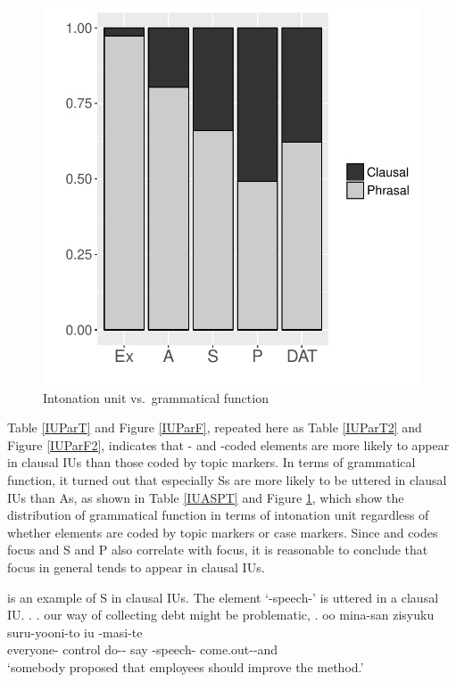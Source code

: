 \begin{figure}
	\begin{center}
	\includegraphics[width=.5\textwidth]{figure/IUASP.pdf}
	\caption{Intonation unit vs.~grammatical function}
	\label{IUASPF}
	\end{center}
\end{figure}

Table \ref{IUParT} and Figure \ref{IUParF},
repeated here as Table \ref{IUParT2} and Figure \ref{IUParF2},
indicates that - and -coded elements are more likely to
appear in clausal IUs than those coded by topic markers.
In terms of grammatical function,
it turned out that especially Ss are more likely to be uttered in
clausal IUs than As,
as shown in Table \ref{IUASPT} and Figure \ref{IUASPF},
which show the distribution of grammatical function in terms of intonation unit regardless of whether elements are coded by topic markers or case markers.
Since  and  codes focus and
S and P also correlate with focus,
it is reasonable to conclude that
focus in general tends to appear in clausal IUs.

\Next[b] is an example of S in clausal IUs.
The element  `-speech-'
is uttered in a clausal IU.
%
\ex.\label{S00M0221_ohanashi}
 \a. our way of collecting debt might be problematic,
 \bg. oo mina-san \tp{\dvline} zisyuku suru-yooni-to iu \tp{\dvline}  -masi-te \tp{\dvline} \\
 	 everyone- {} control do-- say {} -speech- come.out--and {} \\
 		`somebody proposed that employees should improve the method.'

